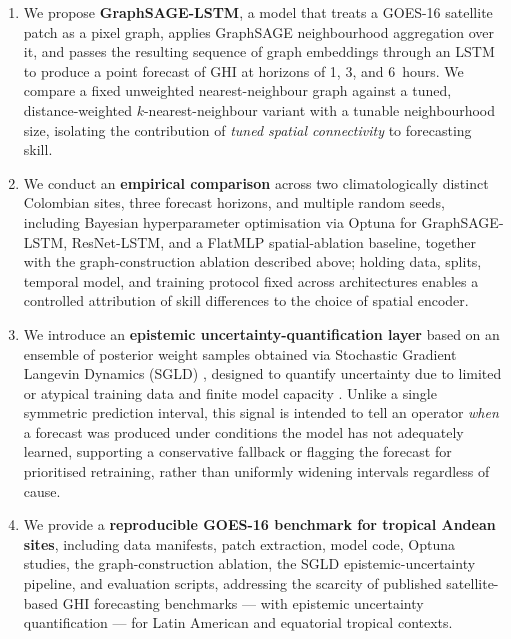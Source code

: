 \begin{enumerate}
  \item We propose \textbf{GraphSAGE-LSTM}, a model that treats a GOES-16 satellite
        patch as a pixel graph, applies GraphSAGE neighbourhood aggregation
        \cite{hamilton2017} over it, and passes the resulting sequence of graph
        embeddings through an LSTM to produce a point forecast of GHI at horizons
        of 1, 3, and 6~hours. We compare a fixed unweighted nearest-neighbour
        graph against a tuned, distance-weighted $k$-nearest-neighbour variant
        with a tunable neighbourhood size, isolating the contribution of
        \emph{tuned spatial connectivity} to forecasting skill.

  \item We conduct an \textbf{empirical comparison} across two climatologically
        distinct Colombian sites, three forecast horizons, and multiple random seeds,
        including Bayesian hyperparameter optimisation via Optuna \cite{akiba2019}
        for GraphSAGE-LSTM, ResNet-LSTM, and a FlatMLP spatial-ablation baseline,
        together with the graph-construction ablation described above; holding
        data, splits, temporal model, and training protocol fixed across
        architectures enables a controlled attribution of skill differences to
        the choice of spatial encoder.

  \item We introduce an \textbf{epistemic uncertainty-quantification layer}
        based on an ensemble of posterior weight samples obtained via
        Stochastic Gradient Langevin Dynamics (SGLD) \cite{welling2011},
        designed to quantify uncertainty due to limited or atypical training
        data and finite model capacity \cite{kendall2017}. Unlike a single
        symmetric prediction interval, this signal is intended to tell an
        operator \emph{when} a forecast was produced under conditions the
        model has not adequately learned, supporting a conservative fallback
        or flagging the forecast for prioritised retraining, rather than
        uniformly widening intervals regardless of cause.

  \item We provide a \textbf{reproducible GOES-16 benchmark for tropical
        Andean sites}, including data manifests, patch extraction, model code,
        Optuna studies, the graph-construction ablation, the SGLD
        epistemic-uncertainty pipeline, and evaluation scripts, addressing
        the scarcity of published satellite-based GHI forecasting benchmarks
        --- with epistemic uncertainty quantification --- for Latin American
        and equatorial tropical contexts.
\end{enumerate}

